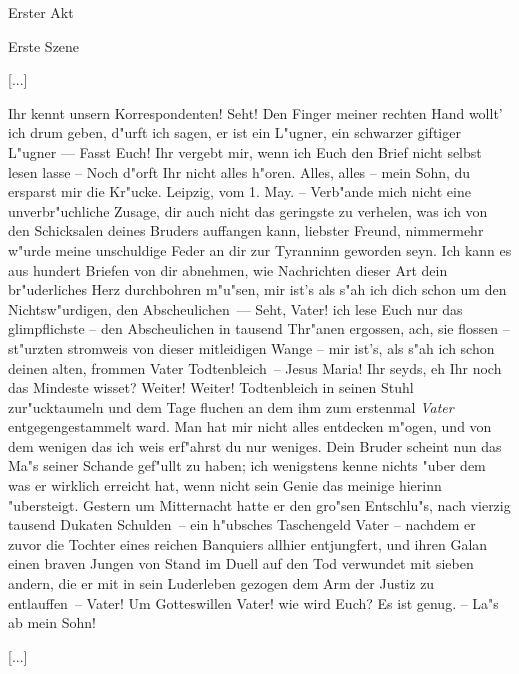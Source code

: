 
\begin{center}

\Large{Erster Akt}

\large{Erste Szene}

\end{center}


[...]

\begin{drama}

\franspeaks {} Ihr kennt unsern Korrespondenten! Seht! Den Finger meiner rechten Hand wollt' ich drum geben, d"urft ich sagen, er ist ein L"ugner, ein schwarzer giftiger L"ugner --- Fasst Euch! Ihr vergebt mir, wenn ich Euch den Brief nicht selbst lesen lasse -- Noch d"orft Ihr nicht alles h"oren.
\moorspeaks Alles, alles -- mein Sohn, du ersparst mir die Kr"ucke.
\franspeaks {} \frqq Leipzig, vom 1. May. -- Verb"ande mich nicht eine unverbr"uchliche Zusage, dir auch nicht das geringste zu verhelen, was ich von den Schicksalen deines Bruders auffangen kann, liebster Freund, nimmermehr w"urde meine unschuldige Feder an dir zur Tyranninn geworden seyn. Ich kann es aus hundert Briefen von dir abnehmen, wie Nachrichten dieser Art dein br"uderliches Herz durchbohren m"u"sen, mir ist's als s"ah ich dich schon um den Nichtsw"urdigen, den Abscheulichen\flqq \ ---  Seht, Vater! ich lese Euch nur das glimpflichste -- \frqq den Abscheulichen in tausend Thr"anen ergossen\flqq , ach, sie flossen -- st"urzten stromweis von dieser mitleidigen Wange -- \frqq mir ist's, als s"ah ich schon deinen alten, frommen Vater Todtenbleich\flqq \ -- Jesus Maria! Ihr seyds, eh Ihr noch das Mindeste wisset?
\moorspeaks Weiter! Weiter!
\franspeaks \frqq Todtenbleich in seinen Stuhl zur"ucktaumeln und dem Tage fluchen an dem ihm zum erstenmal \emph{Vater} entgegengestammelt ward. Man hat mir nicht alles entdecken m"ogen, und von dem wenigen das ich weis erf"ahrst du nur weniges. Dein Bruder scheint nun das Ma"s seiner Schande gef"ullt zu haben; ich wenigstens kenne nichts "uber dem was er wirklich erreicht hat, wenn nicht sein Genie das meinige hierinn "ubersteigt. Gestern um Mitternacht hatte er den gro"sen Entschlu"s, nach vierzig tausend Dukaten Schulden\flqq \ -- ein h"ubsches Taschengeld Vater -- \frqq nachdem er zuvor die Tochter eines reichen Banquiers allhier entjungfert, und ihren Galan einen braven Jungen von Stand im Duell auf den Tod verwundet mit sieben andern, die er mit in sein Luderleben gezogen dem Arm der Justiz zu entlauffen\flqq \ -- Vater! Um Gotteswillen Vater! wie wird Euch?
\moorspeaks Es ist genug. -- La"s ab mein Sohn!

\end{drama}

[...]

\endinput